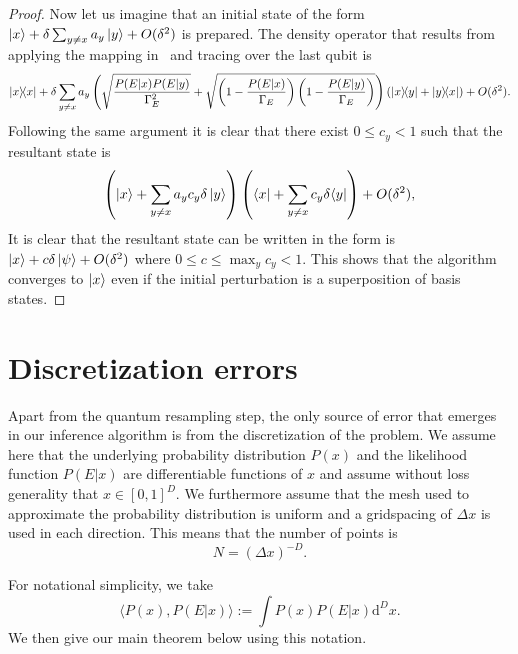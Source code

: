 \documentclass[aps,amsmath,onecolumn,amssymb]{revtex4}
\begin{document}
\begin{proof}
Now let us imagine that an initial state of the form $\left|x\right\rangle + \delta \sum_{y\ne x} a_y \left|y\right\rangle + O(\delta^2)$ is prepared.  The density operator that results from applying the mapping in~ and tracing over the last qubit is
\begin{equation}
|x\rangle\!\langle x| + \delta\sum_{y\ne x}a_y\left(\sqrt{\frac{P(E|x)P(E|y)}{\Gamma_E^2}} + \sqrt{\left(1-\frac{P(E|x)}{\Gamma_E}\right)\left(1-\frac{P(E|y)}{\Gamma_E}\right)} \right)(|x\rangle\!\langle y|+|y\rangle\!\langle x|) + O(\delta^2).
\end{equation}
Following the same argument it is clear that there exist $0\le c_y<1$ such that the resultant state is
\begin{equation}
\left(\left|x\right\rangle + \sum_{y\ne x}a_y c_y\delta \left|y\right\rangle\right)\left(\langle x| + \sum_{y\ne x}c_y\delta \langle y|\right) + O(\delta^2),
\end{equation}
It is clear that the resultant state can be written in the form is $\left|x\right\rangle + c\delta \left|\psi\right\rangle + O(\delta^2)$ where $0\le c\le \max_y c_y < 1$.  This shows that the algorithm converges to $\left|x\right\rangle$ even if the initial perturbation is a superposition of basis states.
\end{proof}


\section{Discretization errors}\label{app:discrete}
Apart from the quantum resampling step, the only source of error that emerges in our inference algorithm is from the discretization of the problem.  We assume here that the underlying probability distribution $P(x)$ and the likelihood function $P(E|x)$ are differentiable functions of $x$ and assume without loss generality that $x\in [0,1]^D$.  We furthermore assume that the mesh used to approximate the probability distribution is uniform and a gridspacing of $\Delta x$ is used in each direction.  This means that the number of points is 
\begin{equation}
N= (\Delta x)^{-D}.
\end{equation}

For notational simplicity,  we take
\begin{equation}
\langle P(x), P(E|x) \rangle := \int P(x) P(E|x) \mathrm{d}^D x.
\end{equation}
We then give our main theorem below using this notation.
\end{document}
